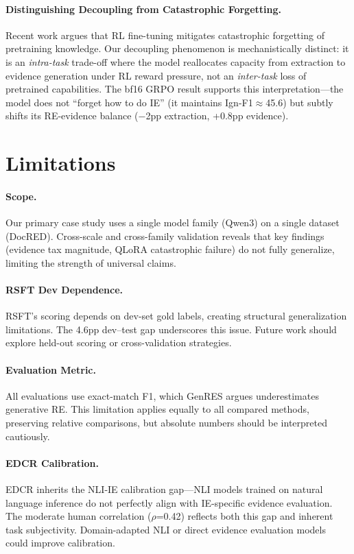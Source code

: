 \documentclass[11pt,a4paper]{article}
\newcommand{\edcr}{EDCR}
\begin{document}
\paragraph{Distinguishing Decoupling from Catastrophic Forgetting.}
Recent work argues that RL fine-tuning mitigates catastrophic forgetting of pretraining knowledge.
Our decoupling phenomenon is mechanistically distinct: it is an \emph{intra-task} trade-off where the model reallocates capacity from extraction to evidence generation under RL reward pressure, not an \emph{inter-task} loss of pretrained capabilities.
The bf16 GRPO result supports this interpretation---the model does not ``forget how to do IE'' (it maintains Ign-F1$\approx$45.6) but subtly shifts its RE-evidence balance ($-$2pp extraction, +0.8pp evidence).

\section{Limitations}
\label{sec:limitations}

\paragraph{Scope.}
Our primary case study uses a single model family (Qwen3) on a single dataset (DocRED).
Cross-scale and cross-family validation reveals that key findings (evidence tax magnitude, QLoRA catastrophic failure) do not fully generalize, limiting the strength of universal claims.

\paragraph{RSFT Dev Dependence.}
RSFT's scoring depends on dev-set gold labels, creating structural generalization limitations.
The 4.6pp dev--test gap underscores this issue.
Future work should explore held-out scoring or cross-validation strategies.

\paragraph{Evaluation Metric.}
All evaluations use exact-match F1, which GenRES \cite{genres2023} argues underestimates generative RE.
This limitation applies equally to all compared methods, preserving relative comparisons, but absolute numbers should be interpreted cautiously.

\paragraph{EDCR Calibration.}
\edcr{} inherits the NLI-IE calibration gap---NLI models trained on natural language inference do not perfectly align with IE-specific evidence evaluation.
The moderate human correlation ($\rho$=0.42) reflects both this gap and inherent task subjectivity.
Domain-adapted NLI or direct evidence evaluation models could improve calibration.
\end{document}
